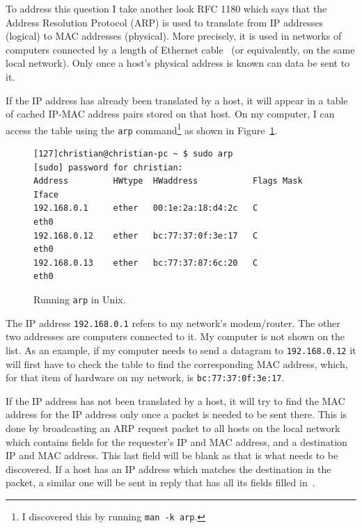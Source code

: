\documentclass[11pt,a4paper]{report}
\begin{document}
	To address this question I take another look RFC 1180 which says that the Address Resolution Protocol (ARP) is used to translate from IP addresses (logical) to MAC addresses (physical). More precisely, it is used in networks of computers connected by a length of Ethernet cable~\cite[Abstract]{arp} (or equivalently, on the same local network). Only once a host's physical address is known can data be sent to it.
	
	If the IP address has already been translated by a host, it will appear in a table of cached IP-MAC address pairs stored on that host. On my computer, I can access the table using the \verb|arp| command\cprotect\footnote{I discovered this by running \verb|man -k arp|.} as shown in Figure~\ref{fig:sudoarp}.
	
		\begin{figure}
		\begin{lstlisting}[style=highlightable, frame=none, numbers=none, xleftmargin=0ex, xrightmargin=0ex, aboveskip=0pt,belowskip=0pt]
[127]christian@christian-pc ~ $ sudo arp
[sudo] password for christian: 
Address         HWtype  HWaddress           Flags Mask     Iface
192.168.0.1     ether   00:1e:2a:18:d4:2c   C              eth0
192.168.0.12    ether   bc:77:37:0f:3e:17   C              eth0
192.168.0.13    ether   bc:77:37:87:6c:20   C              eth0
		\end{lstlisting}
		\cprotect\caption{Running \verb|arp| in Unix.}
		\label{fig:sudoarp}
		\end{figure}
	
	The IP address \verb|192.168.0.1| refers to my network's modem/router. The other two addresses are computers connected to it. My computer is not shown on the list. As an example, if my computer needs to send a datagram to \verb|192.168.0.12| it will first have to check the table to find the corresponding MAC address, which, for that item of hardware on my network, is \verb|bc:77:37:0f:3e:17|.
	
	If the IP address has not been translated by a host, it will try to find the MAC address for the IP address only once a packet is needed to be sent there. This is done by broadcasting an ARP request packet to all hosts on the local network which contains fields for the requester's IP and MAC address, and a destination IP and MAC address. This last field will be blank as that is what needs to be discovered. If a host has an IP address which matches the destination in the packet, a similar one will be sent in reply that has all its fields filled in~\cite[Section 4.3]{tcpip-tute}.
	
\end{document}
